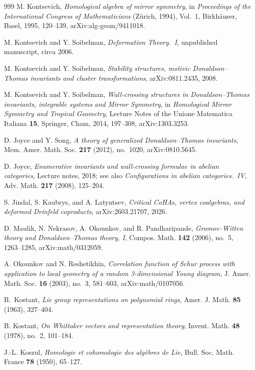 \begin{thebibliography}{999}
M. Kontsevich, \emph{Homological algebra of mirror symmetry}, in \emph{Proceedings of the International Congress of Mathematicians} (Z\"urich, 1994), Vol.~1, Birkh\"auser, Basel, 1995, 120--139, arXiv:alg-geom/9411018.

M. Kontsevich and Y. Soibelman, \emph{Deformation Theory.~I}, unpublished manuscript, circa 2006.

M. Kontsevich and Y. Soibelman, \emph{Stability structures, motivic Donaldson--Thomas invariants and cluster transformations}, arXiv:0811.2435, 2008.

M. Kontsevich and Y. Soibelman, \emph{Wall-crossing structures in Donaldson--Thomas invariants, integrable systems and Mirror Symmetry}, in \emph{Homological Mirror Symmetry and Tropical Geometry}, Lecture Notes of the Unione Matematica Italiana \textbf{15}, Springer, Cham, 2014, 197--308, arXiv:1303.3253.

D. Joyce and Y. Song, \emph{A theory of generalized Donaldson--Thomas invariants}, Mem. Amer. Math. Soc. \textbf{217} (2012), no.~1020, arXiv:0810.5645.

D. Joyce, \emph{Enumerative invariants and wall-crossing formulae in abelian categories}, Lecture notes, 2018; see also \emph{Configurations in abelian categories.~IV}, Adv. Math. \textbf{217} (2008), 125--204.

S. Jindal, S. Kaubrys, and A. Latyntsev, \emph{Critical CoHAs, vertex coalgebras, and deformed Drinfeld coproducts}, arXiv:2603.21707, 2026.

D. Maulik, N. Nekrasov, A. Okounkov, and R. Pandharipande, \emph{Gromov--Witten theory and Donaldson--Thomas theory, I}, Compos. Math. \textbf{142} (2006), no.~5, 1263--1285, arXiv:math/0312059.

A. Okounkov and N. Reshetikhin, \emph{Correlation function of Schur process with application to local geometry of a random 3-dimensional Young diagram}, J. Amer. Math. Soc. \textbf{16} (2003), no.~3, 581--603, arXiv:math/0107056.

B.~Kostant, \emph{Lie group representations on polynomial rings}, Amer. J. Math. \textbf{85} (1963), 327--404.

B. Kostant, \emph{On Whittaker vectors and representation theory}, Invent. Math. \textbf{48} (1978), no.~2, 101--184.

J.-L. Koszul, \emph{Homologie et cohomologie des alg\`ebres de Lie}, Bull. Soc. Math. France \textbf{78} (1950), 65--127.


\end{thebibliography}
